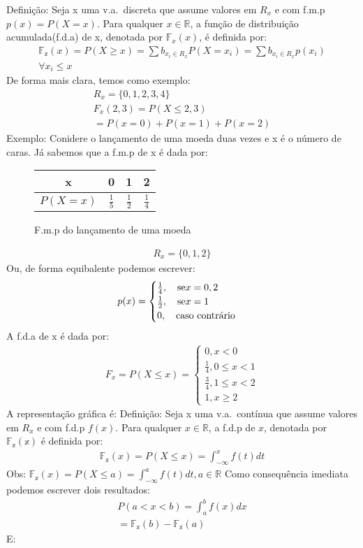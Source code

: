 \documentclass[11pt,a4paper]{article}
\begin{document}
Definição: Seja x uma v.a.\ discreta que assume valores em $R_{x}$ e com f.m.p 
$p(x)=P(X=x)$. Para qualquer $x \in \mathbb{R}$, a função de distribuição 
acumulada(f.d.a) de x, denotada por $\mathbb{F}_{x}(x)$, é definida por: 
\begin{align}
  \mathbb{F_{x}}(x)=P(X \geq x )= \sum b_{x_{i} \in R_{x}} P(X=x_i) = \sum b_{x_{i} \in R_{x}} p(x_i) \\
  \forall x_i \le x \nonumber
\end{align}
De forma mais clara, temos como exemplo: 
\begin{align*}
  R_{x}= \{0,1,2,3,4 \}\\
  F_{x}(2,3)= P(X\le 2,3)\\
  = P(x=0)+P(x=1)+P(x=2)
\end{align*}
Exemplo: 
Conidere o lançamento de uma moeda duas vezes e x é o número de caras. Já sabemos
que a f.m.p de x é dada por:
\begin{figure} 
  \centering
  \begin{tabular}{c c c c}
    \toprule
    x&0&1&2\\ \midrule
    $P(X=x)$&$\frac{1}{5}$&$\frac{1}{2}$&$\frac{1}{4}$\\ \bottomrule
  \end{tabular}
  \label{fig:6}
  \caption{F.m.p do lançamento de uma moeda}
\end{figure}
\begin{align*}
  R_{x}=\{0,1,2\}
\end{align*}
Ou, de forma equibalente podemos escrever: 
\begin{align*}
  p(x)=
  \begin{cases}
    \frac{1}{4}, \text{\quad se} x=0,2\\
    \frac{1}{2}, \text{\quad se} x=1\\
    0, \text{\quad caso contrário}
  \end{cases}
\end{align*}
A f.d.a de x é dada por:
\begin{align*}
  F_{x}=P(X\le x)= 
  \begin{cases}
    0, x<0 \\
    \frac{1}{4}, 0 \le x <1\\
    \frac{3}{4}, 1 \le x < 2\\
    1, x \geq 2
  \end{cases}
\end{align*}
A representação gráfica é: 
Definição: Seja x uma v.a.\ contínua que assume valores em $R_{x}$ e com 
f.d.p $f(x)$. Para qualquer $x \in \mathbb{R}$, a f.d.p de $x$, denotada por 
$\mathbb{F_{x}(x)}$ é definida por: 
\begin{align}
  \mathbb{F_{x}}(x)= P(X \le x)= \int_{- \infty}^{x} f(t)dt 
\end{align}
Obs: $\mathbb{F_{x}}(x)= P(X \le a)= \int_{-\infty}^{a} f(t)dt , a \in \mathbb{R}$
Como consequência imediata podemos escrever dois resultados: 
\begin{align}
  P(a <x<b)= \int_{a}^{b} f(x)dx\\
  = \mathbb{F_{x}}(b)-\mathbb{F_{x}}(a)
\end{align}
E: 
\end{document}
